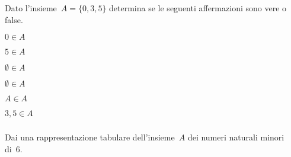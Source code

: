 
\begin{esercizio}
\label{ese:5.15}
Dato l'insieme~\(A = {\{0, 3, 5\}}\) determina se le seguenti affermazioni sono 
vere o false.
\begin{multicols}{3}
\begin{enumeratea}
\item \(0\in A\) \hfill \boxV\quad\boxF
\item \(5\in A\) \hfill \boxV\quad\boxF
\item \(\emptyset \in A\) \hfill \boxV\quad\boxF
\item \(\emptyset\in A\) \hfill \boxV\quad\boxF
\item \(A\in A\) \hfill \boxV\quad\boxF
\item \(3,5\in A\) \hfill \boxV\quad\boxF
\end{enumeratea}
\end{multicols}
\end{esercizio}


\subsubsection*{}

\begin{esercizio}
\label{ese:6.1}
Dai una rappresentazione tabulare dell'insieme~\(A\) dei numeri naturali minori 
di~6.
\end{esercizio}

